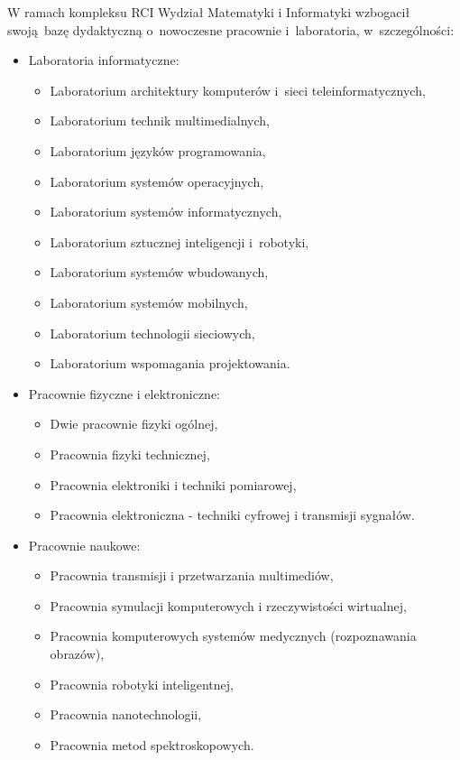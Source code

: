 ﻿\documentclass[a4paper,12pt]{article}
\begin{document}
W ramach kompleksu RCI Wydział Matematyki i Informatyki wzbogacił swoją~bazę dydaktyczną o~nowoczesne pracownie i~laboratoria, w~szczególności:

\begin{itemize}
	\item Laboratoria informatyczne:
	\begin{itemize}
		\item Laboratorium architektury komputerów i~sieci 
			 teleinformatycznych,
		\item Laboratorium technik multimedialnych,
		\item Laboratorium języków programowania,
		\item Laboratorium systemów operacyjnych,
		\item Laboratorium systemów informatycznych,
		\item Laboratorium sztucznej inteligencji i~robotyki,
		\item Laboratorium systemów wbudowanych,
		\item Laboratorium systemów mobilnych,
		\item Laboratorium technologii sieciowych,
		\item Laboratorium wspomagania projektowania.
	\end{itemize}

	\item Pracownie fizyczne i elektroniczne:
	\begin{itemize}
		\item Dwie pracownie fizyki ogólnej,
		\item Pracownia fizyki technicznej,
		\item Pracownia elektroniki i techniki pomiarowej,
		\item Pracownia elektroniczna - techniki cyfrowej i transmisji sygnałów.
	\end{itemize}

	\item Pracownie naukowe:
	\begin{itemize}
		\item Pracownia transmisji i przetwarzania multimediów,
		\item Pracownia symulacji komputerowych i rzeczywistości wirtualnej,
		\item Pracownia komputerowych systemów medycznych (rozpoznawania obrazów),
		\item Pracownia robotyki inteligentnej,
		\item Pracownia nanotechnologii,
		\item Pracownia metod spektroskopowych.
	\end{itemize}
\end{itemize}
\end{document}
